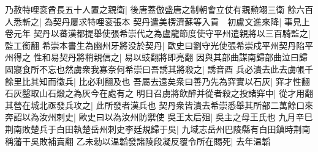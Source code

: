 乃赦特哩衮酋長五十人置之親衛|{
	後唐蓋倣盛唐之制朝會立仗有親勲翊三衛}
餘六百人悉斬之|{
	為契丹屢求特哩衮張本}
契丹遣美楞濟蘇等入貢　初盧文進來降|{
	事見上卷元年}
契丹以蕃漢都提舉使張希崇代之為盧龍節度使守平州遣親將以三百騎監之|{
	監工銜翻}
希崇本書生為幽州牙將没於契丹|{
	歐史曰劉守光使張希崇戍平州契丹陷平州得之}
性和易契丹將稍親信之|{
	易以豉翻將即亮翻}
因與其部曲謀南歸部曲泣曰歸固寢食所不忘也然虜衆我寡奈何希崇曰吾誘其將殺之|{
	誘音酉}
兵必潰去此去虜帳千餘里比其知而徵兵|{
	比必利翻及也}
吾屬去遠矣衆曰善乃先為穽實以石灰|{
	穽才性翻石灰鑿取山石煅之為灰今在處有之}
明日召虜將飲醉并從者殺之投諸穽中|{
	從才用翻}
其營在城北亟發兵攻之|{
	此所發者漢兵也}
契丹衆皆潰去希崇悉舉其所部二萬餘口來奔詔以為汝州刺史|{
	歐史曰以為汝州防禦使}
吳王太后殂|{
	吳主之母王氏也}
九月辛巳荆南敗楚兵于白田執楚岳州刺史李廷規歸于吳|{
	九域志岳州巴陵縣有白田鎮時荆南稱藩干吳敗補賣翻}
乙未勅以温韜發諸陵段凝反覆令所在賜死|{
	去年温韜}


